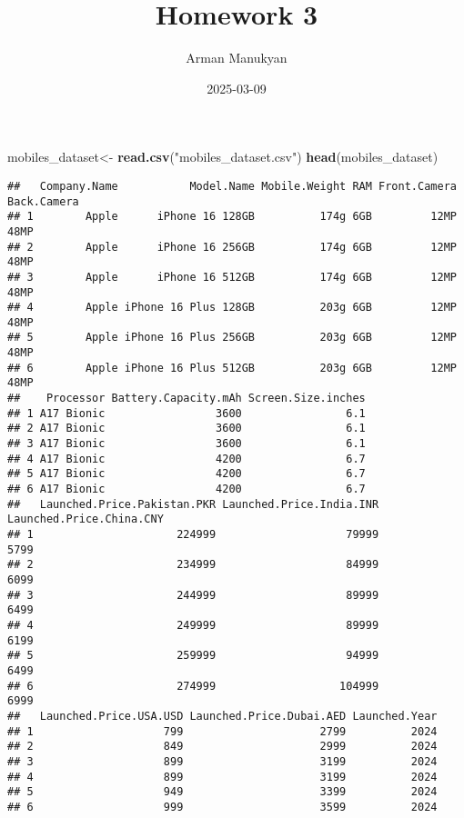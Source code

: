 \documentclass[
]{article}
\title{Homework 3}
\author{Arman Manukyan}
\date{2025-03-09}
\newenvironment{Shaded}{\begin{snugshade}}{\end{snugshade}}
\newcommand{\FunctionTok}[1]{\textcolor[rgb]{0.13,0.29,0.53}{\textbf{#1}}}
\newcommand{\NormalTok}[1]{#1}
\newcommand{\OtherTok}[1]{\textcolor[rgb]{0.56,0.35,0.01}{#1}}
\newcommand{\StringTok}[1]{\textcolor[rgb]{0.31,0.60,0.02}{#1}}
\begin{document}
\maketitle

\begin{Shaded}
\begin{Highlighting}[]
\NormalTok{mobiles\_dataset}\OtherTok{\textless{}{-}} \FunctionTok{read.csv}\NormalTok{(}\StringTok{"mobiles\_dataset.csv"}\NormalTok{)}
\FunctionTok{head}\NormalTok{(mobiles\_dataset)}
\end{Highlighting}
\end{Shaded}

\begin{verbatim}
##   Company.Name           Model.Name Mobile.Weight RAM Front.Camera Back.Camera
## 1        Apple      iPhone 16 128GB          174g 6GB         12MP        48MP
## 2        Apple      iPhone 16 256GB          174g 6GB         12MP        48MP
## 3        Apple      iPhone 16 512GB          174g 6GB         12MP        48MP
## 4        Apple iPhone 16 Plus 128GB          203g 6GB         12MP        48MP
## 5        Apple iPhone 16 Plus 256GB          203g 6GB         12MP        48MP
## 6        Apple iPhone 16 Plus 512GB          203g 6GB         12MP        48MP
##    Processor Battery.Capacity.mAh Screen.Size.inches
## 1 A17 Bionic                 3600                6.1
## 2 A17 Bionic                 3600                6.1
## 3 A17 Bionic                 3600                6.1
## 4 A17 Bionic                 4200                6.7
## 5 A17 Bionic                 4200                6.7
## 6 A17 Bionic                 4200                6.7
##   Launched.Price.Pakistan.PKR Launched.Price.India.INR Launched.Price.China.CNY
## 1                      224999                    79999                     5799
## 2                      234999                    84999                     6099
## 3                      244999                    89999                     6499
## 4                      249999                    89999                     6199
## 5                      259999                    94999                     6499
## 6                      274999                   104999                     6999
##   Launched.Price.USA.USD Launched.Price.Dubai.AED Launched.Year
## 1                    799                     2799          2024
## 2                    849                     2999          2024
## 3                    899                     3199          2024
## 4                    899                     3199          2024
## 5                    949                     3399          2024
## 6                    999                     3599          2024
\end{verbatim}
\end{document}

